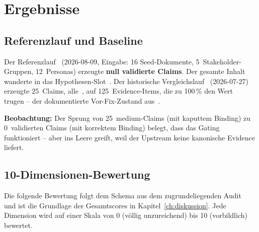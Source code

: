 
\chapter{Ergebnisse}\label{ch:ergebnisse}

\section{Referenzlauf und Baseline}\label{sec:r2}

Der Referenzlauf~\cite{audit-r2} (2026-08-09, Eingabe: 16 Seed-Dokumente, 5~Stakeholder-Gruppen, 12~Personas) erzeugte \textbf{null validierte Claims}. Der gesamte Inhalt wanderte in das Hypothesen-Slot~. Der historische Vergleichslauf~\cite{audit-r1} (2026-07-27) erzeugte 25~Claims, alle~, auf 125~Evidence-Items, die zu 100\,\% den Wert~ trugen -- der dokumentierte Vor-Fix-Zustand aus~\cite{adr-0011}.

\textbf{Beobachtung:} Der Sprung von 25~medium-Claims (mit kaputtem Binding) zu 0~validierten Claims (mit korrektem Binding) belegt, dass das Gating funktioniert -- aber ins Leere greift, weil der Upstream keine kanonische Evidence liefert.

\section{10-Dimensionen-Bewertung}\label{sec:scoring}

Die folgende Bewertung folgt dem Schema aus dem zugrundeliegenden Audit~\cite{zenodo-agora} und ist die Grundlage der Gesamtscores in Kapitel~\ref{ch:diskussion}. Jede Dimension wird auf einer Skala von 0 (v{\"o}llig unzureichend) bis 10 (vorbildlich) bewertet.

